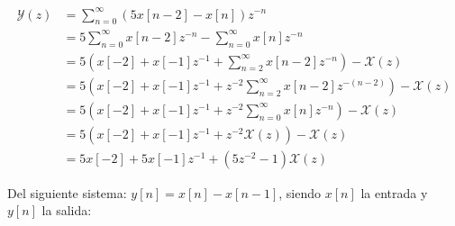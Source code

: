 \documentclass[addpoints,answers]{exam}
\begin{document}
\begin{questions}
\begin{solution}
\[
\begin{array}{ll}
	\mathscr{Y}(z)	&= \sum_{n=0}^{\infty} \left(5 x[n-2] - x[n]\right)z^{-n} \\
					&= 5 \sum_{n=0}^{\infty} x[n-2] z^{-n} - \sum_{n=0}^{\infty} x[n] z^{-n} \\
					&= 5 \left( x[-2] + x[-1] z^{-1} + \sum_{n=2}^{\infty} x[n-2] z^{-n} \right) - \mathscr{X}(z) \\
					&= 5 \left( x[-2] + x[-1] z^{-1} + z^{-2} \sum_{n=2}^{\infty} x[n-2] z^{-(n-2)} \right) - \mathscr{X}(z) \\
					&= 5 \left( x[-2] + x[-1] z^{-1} + z^{-2} \sum_{n=0}^{\infty} x[n] z^{-n} \right) - \mathscr{X}(z) \\
					&= 5 \left( x[-2] + x[-1] z^{-1} + z^{-2} \mathscr{X}(z) \right) - \mathscr{X}(z) \\
					&= 5 x[-2] + 5 x[-1] z^{-1} + \left(5 z^{-2} -1 \right) \mathscr{X}(z)
\end{array}
\]
\end{solution}

\question
Del siguiente sistema: \(y[n] = x[n] - x[n-1]\), siendo \(x[n]\) la entrada y \(y[n]\) la salida:

\end{questions}
\end{document}
